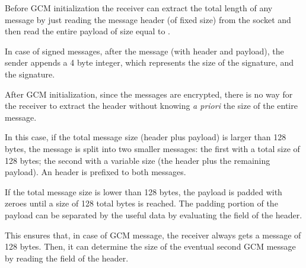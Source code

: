 Before GCM initialization the receiver can extract the total length of any
message by just reading the message header (of fixed size) from the socket and
then read the entire payload of size equal to .

In case of signed messages, after the message (with header and payload), the
sender appends a 4 byte integer, which represents the size of the signature, and
the signature.

After GCM initialization, since the messages are encrypted, there is no way for
the receiver to extract the header without knowing \emph{a priori} the size of
the entire message.

In this case, if the total message size (header plus payload) is larger than 128
bytes, the message is split into two smaller messages: the first with a total
size of 128 bytes; the second with a variable size (the header plus the
remaining payload). An header is prefixed to both messages.

If the total message size is lower than 128 bytes, the payload is padded with
zeroes until a size of 128 total bytes is reached. The padding portion of the
payload can be separated by the useful data by evaluating the
 field of the header.

This ensures that, in case of GCM message, the receiver always gets a message of
128 bytes. Then, it can determine the size of the eventual second GCM message by
reading the  field of the header.



